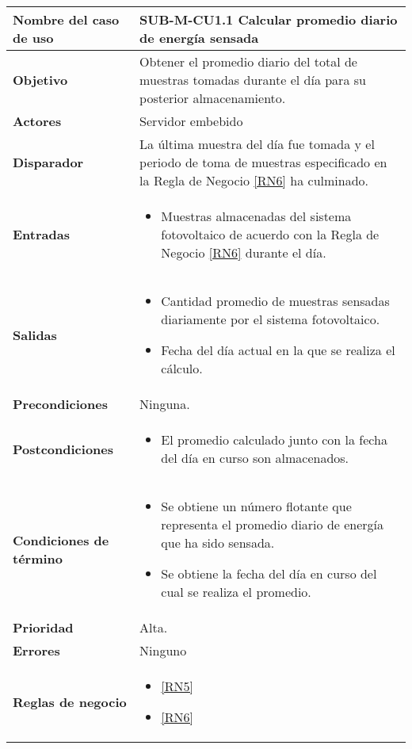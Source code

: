 \begin{longtable}{|J{5cm}|J{10.3cm}|}
	\hline
	\textbf{Nombre del caso de uso} &
		SUB-M-CU1.1 Calcular promedio diario de energía sensada \\ \hline
	\textbf{Objetivo} &
		Obtener el promedio diario del total de muestras tomadas durante el día para su posterior almacenamiento. \\ \hline
	\textbf{Actores} &
		Servidor embebido \\ \hline 
	\textbf{Disparador} & 
		La última muestra del día fue tomada y el periodo de toma de muestras especificado en la Regla de Negocio \ref{RN6} ha culminado. \\ \hline 
	\textbf{Entradas} & 
		\begin{itemize}
				\item Muestras almacenadas del sistema fotovoltaico de acuerdo con la Regla de Negocio \ref{RN6} durante el día.
		\end{itemize}\\ \hline 
	\textbf{Salidas} & 
		\begin{itemize}
			\item Cantidad promedio de muestras sensadas diariamente por el sistema fotovoltaico.
			\item Fecha del día actual en la que se realiza el cálculo.
		\end{itemize} \\ \hline
	\textbf{Precondiciones} &
		Ninguna.\\ \hline
	\textbf{Postcondiciones} &
		\begin{itemize}
			\item El promedio calculado junto con la fecha del día en curso son almacenados.
		\end{itemize}\\ \hline
	\textbf{Condiciones de término} & 
		\begin{itemize}
			\item Se obtiene un número flotante que representa el promedio diario de energía que ha sido sensada.
			\item Se obtiene la fecha del día en curso del cual se realiza el promedio.
		\end{itemize} \\ \hline 
	\textbf{Prioridad} & 
		Alta. \\ \hline
	\textbf{Errores} & 
	    Ninguno
		\\ \hline
	\textbf{Reglas de negocio} & 
		\begin{itemize}
			\item \ref{RN5}
			\item \ref{RN6}
		\end{itemize} \\ \hline

\end{longtable}

